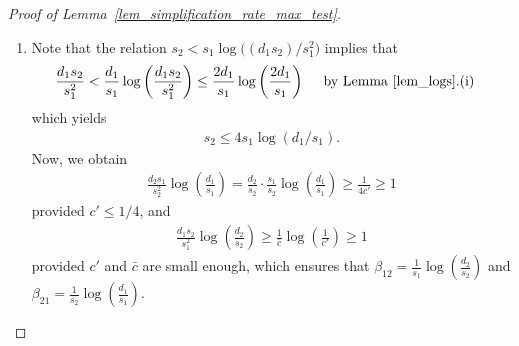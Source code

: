 \documentclass{article}
\theoremstyle{remark}
\begin{document}
\begin{proof}[Proof of Lemma~\ref{lem_simplification_rate_max_test}]
\phantom{ }

\begin{enumerate}
    \item 

Note that the relation $s_2 < s_1\log\big((d_1s_2)/s_1^2\big)$ implies that 
\begin{align*}
    \frac{d_1s_2}{s_1^2} &< \frac{d_1}{s_1} \log\left(\frac{d_1s_2}{s_1^2}\right) \leq \frac{2d_1}{s_1} \log\left(\frac{2d_1}{s_1}\right) \quad \text{ by Lemma~\ref{lem_logs}.(i)}
\end{align*}
which yields 
\begin{align}
    s_2 \leq 4 s_1 \log(d_1/s_1). \label{eq_s2<s1_log(d1/s1)}
\end{align}
Now, we obtain 
\begin{align*}
    \frac{d_2s_1}{s_2^2} \log\left(\frac{d_1}{s_1}\right) = \frac{d_2}{s_2} \cdot \frac{s_1}{s_2} \log\left(\frac{d_1}{s_1}\right) \geq \frac{1}{4c'} \geq 1 %
\end{align*}
provided $c' \leq 1/4$, and 
\begin{align*}
    \frac{d_1s_2}{s_1^2} \log\left(\frac{d_2}{s_2}\right) \geq \frac{1}{\bar c} \log\left(\frac{1}{c'}\right) \geq 1 %
\end{align*}
provided $c'$ and $\bar c$ are small enough, which ensures that $\beta_{12 } = \frac{1}{s_1} \log\left(\frac{d_2}{s_2}\right)$ and $\beta_{21} = \frac{1}{s_2} \log\left(\frac{d_1}{s_1}\right)$. 


\end{enumerate}
\end{proof}
\end{document}
